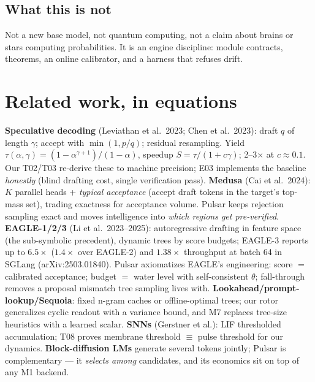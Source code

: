 \documentclass[11pt,a4paper]{article}
\theoremstyle{definition}
\begin{document}
\subsection{What this is not}
Not a new base model, not quantum computing, not a claim about brains or
stars computing probabilities. It is an engine discipline: module contracts,
theorems, an online calibrator, and a harness that refuses drift.

\section{Related work, in equations}
\label{sec:related}
\textbf{Speculative decoding} (Leviathan et al.\ 2023; Chen et al.\ 2023):
draft $q$ of length $\gamma$; accept with $\min(1,p/q)$; residual resampling.
Yield $\tau(\alpha,\gamma)=(1-\alpha^{\gamma+1})/(1-\alpha)$, speedup
$S=\tau/(1+c\gamma)$; 2--3$\times$ at $c\approx0.1$. Our T02/T03 re-derive
these to machine precision; E03 implements the baseline \emph{honestly}
(blind drafting cost, single verification pass).
\textbf{Medusa} (Cai et al.\ 2024): $K$ parallel heads + \emph{typical
acceptance} (accept draft tokens in the target's top-mass set), trading
exactness for acceptance volume. Pulsar keeps rejection sampling exact and
moves intelligence into \emph{which regions get pre-verified}.
\textbf{EAGLE-1/2/3} (Li et al.\ 2023--2025): autoregressive drafting in
feature space (the sub-symbolic precedent), dynamic trees by score budgets;
EAGLE-3 reports up to $6.5\times$ ($1.4\times$ over EAGLE-2) and $1.38\times$
throughput at batch 64 in SGLang (arXiv:2503.01840). Pulsar axiomatizes
EAGLE's engineering: score $=$ calibrated acceptance; budget $=$ water level
with self-consistent $\theta$; fall-through removes a proposal mismatch tree
sampling lives with. \textbf{Lookahead/prompt-lookup/Sequoia}: fixed n-gram
caches or offline-optimal trees; our rotor generalizes cyclic readout with a
variance bound, and M7 replaces tree-size heuristics with a learned scalar.
\textbf{SNNs} (Gerstner et al.): LIF thresholded accumulation; T08 proves
membrane threshold $\equiv$ pulse threshold for our dynamics.
\textbf{Block-diffusion LMs} generate several tokens jointly; Pulsar is
complementary --- it \emph{selects among} candidates, and its economics sit
on top of any M1 backend.
\end{document}
